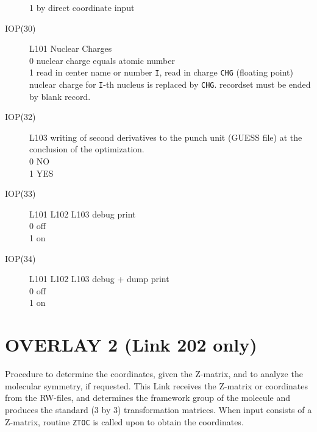 \begin{description}
1  by direct coordinate input \\
\item[IOP(30)] L101  Nuclear Charges \\
0  nuclear charge equals atomic number \\
1  read in center name or number {\tt I}, read in charge {\tt CHG} (floating 
point) nuclear charge for {\tt I}-th nucleus is replaced by {\tt CHG}.
recordset must be ended by blank record.
\item[IOP(32)] L103  writing of second derivatives to the punch unit (GUESS
file) at the conclusion of the optimization.  \\
0  NO \\
1  YES \\
\item[IOP(33)] L101 L102 L103  debug print  \\
0  off \\
1  on \\
\item[IOP(34)] L101 L102 L103  debug + dump print  \\
0  off \\
1  on \\
\end{description}
\section{\sf OVERLAY 2 (Link 202 only)}
Procedure to determine the coordinates, given the Z-matrix, and to
analyze the molecular symmetry, if requested.
This Link receives the Z-matrix or coordinates from the RW-files, and
determines the framework group of the molecule and produces the
standard (3 by 3) transformation matrices. When input consists of a
Z-matrix, routine {\tt ZTOC} is called upon to obtain the coordinates.
